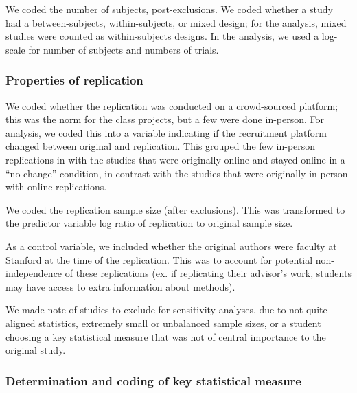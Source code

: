 \documentclass[
  english,
  a4paper,
]{article}
\begin{document}
We coded the number of subjects, post-exclusions. We coded whether a study had a between-subjects, within-subjects, or mixed design; for the analysis, mixed studies were counted as within-subjects designs. In the analysis, we used a log-scale for number of subjects and numbers of trials.

\hypertarget{properties-of-replication}{%
\subsubsection{Properties of replication}\label{properties-of-replication}}

We coded whether the replication was conducted on a crowd-sourced platform; this was the norm for the class projects, but a few were done in-person. For analysis, we coded this into a variable indicating if the recruitment platform changed between original and replication. This grouped the few in-person replications in with the studies that were originally online and stayed online in a ``no change'' condition, in contrast with the studies that were originally in-person with online replications.

We coded the replication sample size (after exclusions). This was transformed to the predictor variable log ratio of replication to original sample size.

As a control variable, we included whether the original authors were faculty at Stanford at the time of the replication. This was to account for potential non-independence of these replications (ex. if replicating their advisor's work, students may have access to extra information about methods).

We made note of studies to exclude for sensitivity analyses, due to not quite aligned statistics, extremely small or unbalanced sample sizes, or a student choosing a key statistical measure that was not of central importance to the original study.

\hypertarget{determination-and-coding-of-key-statistical-measure}{%
\subsubsection{Determination and coding of key statistical measure}\label{determination-and-coding-of-key-statistical-measure}}
\end{document}
